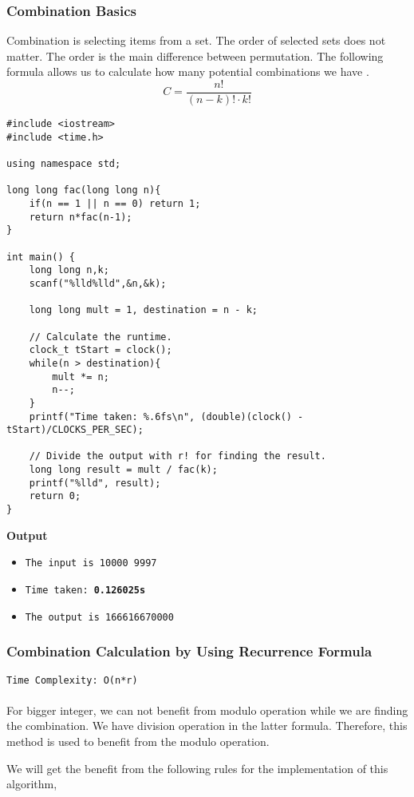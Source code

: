 \documentclass[12pt]{article}
\begin{document}
\subsubsection{Combination Basics}
Combination is selecting items from a set. The order of selected sets does not matter. The order is the main difference between permutation. The following formula allows us to calculate how many potential combinations we have \cite{combinationbasic}.
\[C =\frac{n!}{(n-k)! \cdot k!} \]
\begin{verbatim}
#include <iostream>
#include <time.h>

using namespace std;

long long fac(long long n){
    if(n == 1 || n == 0) return 1;
    return n*fac(n-1);
}

int main() {
    long long n,k;
    scanf("%lld%lld",&n,&k);
    
    long long mult = 1, destination = n - k;
    
    // Calculate the runtime.
    clock_t tStart = clock();
    while(n > destination){
        mult *= n;
        n--;
    }
    printf("Time taken: %.6fs\n", (double)(clock() - tStart)/CLOCKS_PER_SEC);
    
    // Divide the output with r! for finding the result.
    long long result = mult / fac(k);
    printf("%lld", result);
    return 0;
}
\end{verbatim}
\textbf{Output}
\begin{itemize}
  \item \texttt{The input is 10000 9997} 
  \item \texttt{Time taken: \textbf{0.126025s}} 
  \item \texttt{The output is 166616670000}
\end{itemize}
\clearpage
\subsubsection{Combination Calculation by Using Recurrence Formula}
\texttt{Time Complexity: O(n*r) } \\ \\
For bigger integer, we can not benefit from modulo operation while we are finding the combination. We have division operation in the latter formula. Therefore, this method is used to benefit from the modulo operation. 

We will get the benefit from the following rules for the implementation of this algorithm,
\end{document}
